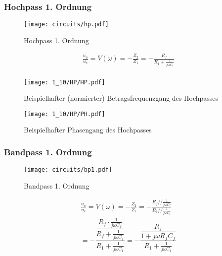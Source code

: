 \subsubsection{Hochpass 1. Ordnung}

\begin{figure}[H]
  \begin{center}
    \texttt{[image: circuits/hp.pdf]}
  \end{center}
  \caption{Hochpass 1. Ordnung}
\end{figure}

\begin{gather*}
  \frac{u_a}{u_e} = V(\omega) = -\frac{Z_2}{Z_1} = -\frac{R_f}{R_1 +
    \frac{1}{j\omega C_1}}\\
\end{gather*}



\begin{figure}[H]
  \begin{center}
    \texttt{[image: 1\_10/HP/HP.pdf]}
  \end{center}
  \caption{Beispielhafter (normierter) Betragsfrequenzgang des Hochpasses}
\end{figure}

\begin{figure}[H]
  \begin{center}
    \texttt{[image: 1\_10/HP/PH.pdf]}
  \end{center}
  \caption{Beispielhafter Phasengang des Hochpasses}
\end{figure}

\subsubsection{Bandpass 1. Ordnung}
\begin{figure}[H]
  \begin{center}
    \texttt{[image: circuits/bp1.pdf]}
  \end{center}
  \caption{Bandpass 1. Ordnung}
\end{figure}

\begin{gather*}
  \frac{u_a}{u_e} = V(\omega) = -\frac{Z_2}{Z_1} = -\frac{R_f // \frac{1}{j \omega
    C_f}}{R_1 // \frac{1}{j \omega C_1}}\\
= - \dfrac{ \dfrac{R_f \cdot \frac{1}{j \omega C_f}}{R_f + \frac{1}{j \omega
      C_f}} }{ R_1 + \frac{1}{j \omega C_1} }
= - \dfrac{ \dfrac{R_f}{1 + j \omega R_f C_f} }{ R_1 + \frac{1}{j \omega C_1}
}\\
\end{gather*}

